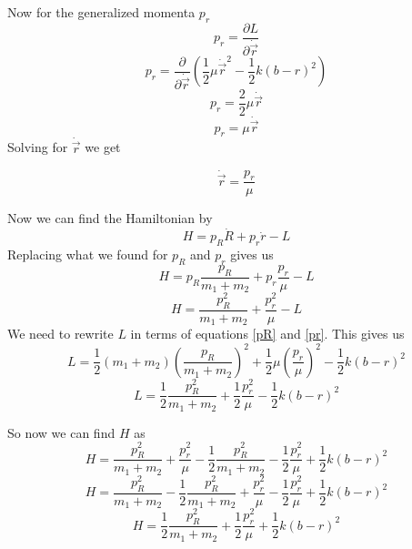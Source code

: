 \documentclass[11pt]{article}
\numberwithin{equation}{section}
\begin{document}
\begin{enumerate}[(a)]
Now for the generalized momenta $p_r$
$$p_r = \frac{\partial L}{\partial \dot{\vec{r}}}$$
$$p_r = \frac{\partial }{\partial \dot{\vec{r}}}\left(\frac{1}{2}\mu \dot{\vec{r}}^2 - \frac{1}{2}k\left(b-r\right)^2\right)$$
$$p_r = \frac{2}{2}\mu \dot{\vec{r}}$$
$$p_r = \mu \dot{\vec{r}}$$
Solving for $\dot{\vec{r}}$ we get

\begin{equation}
\dot{\vec{r}}= \frac{p_r}{\mu}
\label{pr}
\end{equation}

Now we can find the Hamiltonian by
$$H = p_R\dot{R} + p_r\dot{r} - L$$
Replacing what we found for $p_R$ and $p_r$ gives us
$$H = p_R\frac{p_R}{m_1+m_2} + p_r\frac{p_r}{\mu} - L$$
$$H = \frac{p_R^2}{m_1+m_2} + \frac{p_r^2}{\mu} - L$$
We need to rewrite $L$ in terms of equations \ref{pR} and \ref{pr}. This gives us
$$L= \frac{1}{2}(m_1+m_2)\left(\frac{p_R}{m_1+m_2}\right)^2 + \frac{1}{2}\mu \left(\frac{p_r}{\mu}\right)^2 - \frac{1}{2}k\left(b-r\right)^2$$
$$L= \frac{1}{2}\frac{p_R^2}{m_1+m_2} + \frac{1}{2} \frac{p_r^2}{\mu} - \frac{1}{2}k\left(b-r\right)^2$$

So now we can find $H$ as 
$$H = \frac{p_R^2}{m_1+m_2} + \frac{p_r^2}{\mu}  - \frac{1}{2}\frac{p_R^2}{m_1+m_2} - \frac{1}{2} \frac{p_r^2}{\mu} + \frac{1}{2}k\left(b-r\right)^2$$
$$H = \frac{p_R^2}{m_1+m_2}   - \frac{1}{2}\frac{p_R^2}{m_1+m_2} + \frac{p_r^2}{\mu}- \frac{1}{2} \frac{p_r^2}{\mu} + \frac{1}{2}k\left(b-r\right)^2$$
$$H = \frac{1}{2}\frac{p_R^2}{m_1+m_2} + \frac{1}{2} \frac{p_r^2}{\mu} + \frac{1}{2}k\left(b-r\right)^2$$


\end{enumerate}
\end{document}
